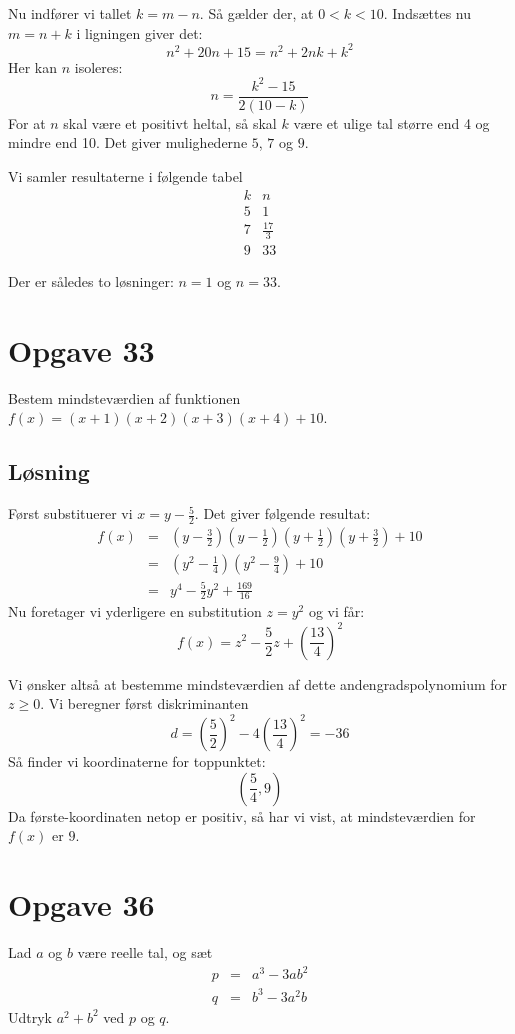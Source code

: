 \documentclass[12pt,oneside,a4paper]{article}
\newcommand{\bas}{\begin{eqnarray*}}
\newcommand{\eas}{\end{eqnarray*}}
\begin{document}
Nu indfører vi tallet $k = m-n$. Så gælder der, at $0 < k < 10$. Indsættes nu $m=n+k$ i ligningen giver det:
$$
n^2+20n+15 = n^2+2nk + k^2
$$
Her kan $n$ isoleres:
$$
n = \frac{k^2-15}{2(10-k)}
$$
For at $n$ skal være et positivt heltal, så skal $k$ være et ulige tal større end 4 og mindre end 10. Det giver mulighederne $5$, $7$ og $9$.

Vi samler resultaterne i følgende tabel
$$
\begin{array}{cc}
    k & n \\
    \hline
    5 & 1 \\
    7 & \frac{17}{3} \\
    9 & 33
\end{array}
$$

Der er således to løsninger: $n=1$ og $n=33$.

\section{Opgave 33}
Bestem mindsteværdien af funktionen $f(x) = (x+1)(x+2)(x+3)(x+4) + 10$.

\subsection{Løsning}
Først substituerer vi $x=y-\frac 52$. Det giver følgende resultat:
\bas
f(x) &=& \left(y-\frac 32\right) \left(y-\frac 12\right) \left(y+\frac 12\right) \left(y+\frac 32\right) + 10 \\
     &=& \left(y^2 - \frac 14\right) \left(y^2 - \frac 94\right) + 10 \\
     &=& y^4 - \frac 52 y^2 + \frac{169}{16}
\eas
Nu foretager vi yderligere en substitution $z=y^2$ og vi får:
$$
f(x) = z^2 - \frac 52 z + \left(\frac{13}{4}\right)^2
$$

Vi ønsker altså at bestemme mindsteværdien af dette andengradspolynomium for $z\ge 0$.
Vi beregner først diskriminanten
$$
d=\left(\frac 52\right)^2 - 4 \left(\frac{13}{4}\right)^2 = -36
$$
Så finder vi koordinaterne for toppunktet:
$$
\left(\frac 54, 9 \right)
$$
Da første-koordinaten netop er positiv, så har vi vist, at mindsteværdien for $f(x)$ er $9$.



\section{Opgave 36}
Lad $a$ og $b$ være reelle tal, og sæt
\bas
p &=& a^3 -3ab^2 \\
q &=& b^3 -3a^2b
\eas
Udtryk $a^2+b^2$ ved $p$ og $q$.
\end{document}
